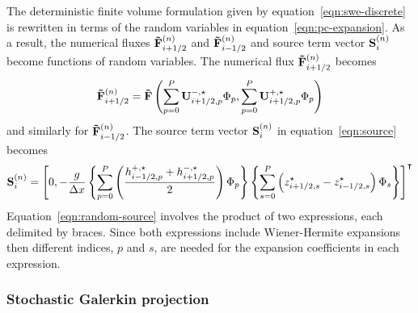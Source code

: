 The deterministic finite volume formulation given by equation~\eqref{eqn:swe-discrete} is rewritten in terms of the random variables in equation~\eqref{eqn:pc-expansion}.
As a result, the numerical fluxes $\mathbf{\tilde{F}}_{i+1/2}^{(n)}$ and $\mathbf{\tilde{F}}_{i-1/2}^{(n)}$ and source term vector $\mathbf{S}_i^{(n)}$ become functions of random variables.
The numerical flux $\mathbf{\tilde{F}}_{i+1/2}^{(n)}$ becomes
\begin{align}
	\mathbf{\tilde{F}}_{i+1/2}^{(n)} = \mathbf{\tilde{F}} \left(
	\sum_{p=0}^P \mathbf{U}^{-,\star}_{i+1/2,p} \Phi_p, 
	\sum_{p=0}^P \mathbf{U}^{+,\star}_{i+1/2,p} \Phi_p
	\right)
\end{align}
and similarly for $\mathbf{\tilde{F}}_{i-1/2}^{(n)}$.
The source term vector $\mathbf{S}_i^{(n)}$ in equation~\eqref{eqn:source} becomes
\begin{align}
	\mathbf{S}_i^{(n)} = \left[ 0, -\frac{g}{\Delta x}
	\left\{
	\sum_{p=0}^P \left(\frac{h^{+,\star}_{i-1/2,p} + h^{-,\star}_{i+1/2,p}}{2} \right) \Phi_p \right\}
\left\{ \sum_{s=0}^P \left( z^\star_{i+1/2,s} - z^\star_{i-1/2,s} \right) \Phi_s \right\}
	\right]^\intercal
	\label{eqn:random-source}
\end{align}
Equation~\eqref{eqn:random-source} involves the product of two expressions, each delimited by braces.
Since both expressions include Wiener-Hermite expansions then different indices, $p$ and $s$, are needed for the expansion coefficients in each expression.

\subsubsection*{Stochastic Galerkin projection}

